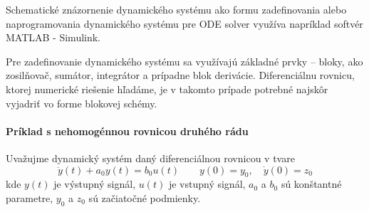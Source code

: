 \documentclass[a4paper, 10pt, ]{article}
\begin{document}
Schematické znázornenie dynamického systému ako formu zadefinovania alebo naprogramovania dynamického systému pre ODE solver využíva napríklad softvér MATLAB - Simulink.

Pre zadefinovanie dynamického systému sa využívajú základné prvky -- bloky, ako zosilňovač, sumátor, integrátor a prípadne blok derivácie. Diferenciálnu rovnicu, ktorej numerické riešenie hľadáme, je v takomto prípade potrebné najskôr vyjadriť vo forme blokovej schémy.

\paragraph{Príklad s nehomogénnou rovnicou druhého rádu}

Uvažujme dynamický systém daný diferenciálnou rovnicou v tvare
\begin{equation} \label{eq:DR2R}
    \ddot y(t) + a_0 y(t) = b_0 u(t) \qquad y(0) = y_0, \quad \dot y(0) = z_0
\end{equation}
kde $y(t)$ je výstupný signál, $u(t)$ je vstupný signál, $a_0$ a $b_0$ sú konštantné parametre, $y_0$ a $z_0$ sú začiatočné podmienky. 
\end{document}
